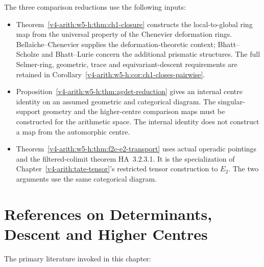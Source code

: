 \begin{remark}
\label{v4-arith:w5-h:rem:wave5-hziv-data}
The three comparison reductions use the following inputs:
\begin{itemize}
\item Theorem~\ref{v4-arith:w5-h:thm:ch1-closure} constructs the local-to-global
ring map from the universal property of the Chenevier deformation
rings. Bella\"iche--Chenevier supplies the deformation-theoretic
context; Bhatt--Scholze and Bhatt--Lurie concern the additional
prismatic structures. The full Selmer-ring, geometric, trace and
equivariant-descent requirements are retained in
Corollary~\ref{v4-arith:w5-h:cor:ch1-closes-pairwise}.
\item Proposition~\ref{v4-arith:w5-h:thm:agdet-reduction} gives an internal
centre identity on an assumed geometric and categorical diagram.
The singular-support geometry and the higher-centre comparison
maps must be constructed for the arithmetic space. The internal
identity does not construct a map from the automorphic centre.
\item Theorem~\ref{v4-arith:w5-h:thm:f2c-e2-transport} uses actual
operadic pointings and the filtered-colimit theorem HA~3.2.3.1.
It is the specialization of
Chapter~\ref{v4-arith:tate-tensor}'s restricted tensor construction
to \(E_2\). The two arguments use the same categorical diagram.
\end{itemize}
\end{remark}

\section{References on Determinants, Descent and Higher Centres}
\label{v4-arith:w5-h:bibliography}

The primary literature invoked in this chapter:

